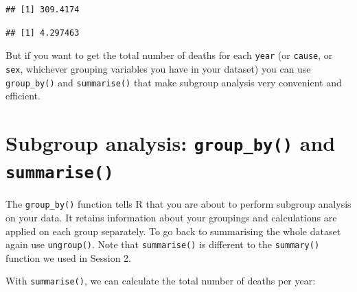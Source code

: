\documentclass[12pt,]{krantz}
\makeatletter
\newenvironment{Shaded}{\begin{snugshade}}{\end{snugshade}}
\newcommand{\DataTypeTok}[1]{\textcolor[rgb]{0.13,0.29,0.53}{#1}}
\newcommand{\KeywordTok}[1]{\textcolor[rgb]{0.13,0.29,0.53}{\textbf{#1}}}
\newcommand{\NormalTok}[1]{#1}
\newcommand{\OperatorTok}[1]{\textcolor[rgb]{0.81,0.36,0.00}{\textbf{#1}}}
\newcommand{\StringTok}[1]{\textcolor[rgb]{0.31,0.60,0.02}{#1}}
\newenvironment{kframe}{%
\medskip{}
\setlength{\fboxsep}{.8em}
 \def\at@end@of@kframe{}%
 \ifinner\ifhmode%
  \def\at@end@of@kframe{\end{minipage}}%
  \begin{minipage}{\columnwidth}%
 \fi\fi%
 \def\FrameCommand##1{\hskip\@totalleftmargin \hskip-\fboxsep
 \colorbox{shadecolor}{##1}\hskip-\fboxsep
     \hskip-\linewidth \hskip-\@totalleftmargin \hskip\columnwidth}%
 \MakeFramed {\advance\hsize-\width
   \@totalleftmargin\z@ \linewidth\hsize
   \@setminipage}}%
 {\par\unskip\endMakeFramed%
 \at@end@of@kframe}
\renewenvironment{Shaded}{\begin{kframe}}{\end{kframe}}
\theoremstyle{definition}
\theoremstyle{definition}
\theoremstyle{definition}
\theoremstyle{remark}
\makeatother
\begin{document}
\begin{verbatim}
## [1] 309.4174
\end{verbatim}

\begin{Shaded}
\end{Shaded}

\begin{verbatim}
## [1] 4.297463
\end{verbatim}

But if you want to get the total number of deaths for each \texttt{year}
(or \texttt{cause}, or \texttt{sex}, whichever grouping variables you
have in your dataset) you can use \texttt{group\_by()} and
\texttt{summarise()} that make subgroup analysis very convenient and
efficient.

\hypertarget{subgroup-analysis-group_by-and-summarise}{%
\section{\texorpdfstring{Subgroup analysis: \texttt{group\_by()} and
\texttt{summarise()}}{Subgroup analysis: group\_by() and summarise()}}\label{subgroup-analysis-group_by-and-summarise}}

The \texttt{group\_by()} function tells R that you are about to perform
subgroup analysis on your data. It retains information about your
groupings and calculations are applied on each group separately. To go
back to summarising the whole dataset again use \texttt{ungroup()}. Note
that \texttt{summarise()} is different to the \texttt{summary()}
function we used in Session 2.

With \texttt{summarise()}, we can calculate the total number of deaths
per year:

\begin{Shaded}
\end{Shaded}
\end{document}
